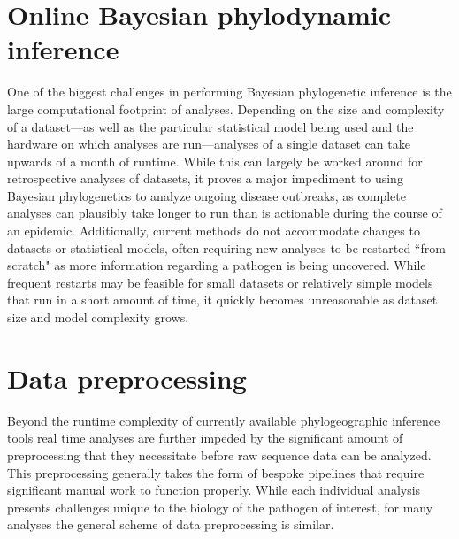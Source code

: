 \section{Online Bayesian phylodynamic inference} %

One of the biggest challenges in performing Bayesian phylogenetic inference is the large computational footprint of analyses.
Depending on the size and complexity of a dataset---as well as the particular statistical model being used and the hardware on which analyses are run---analyses of a single dataset can take upwards of a month of runtime.
While this can largely be worked around for retrospective analyses of datasets, it proves a major impediment to using Bayesian phylogenetics to analyze ongoing disease outbreaks, %
as complete analyses can plausibly take longer to run than is actionable during the course of an epidemic.
Additionally, current methods do not accommodate changes to datasets or statistical models, often requiring new analyses to be restarted ``from scratch" as more information regarding a pathogen is being uncovered.
While frequent restarts may be feasible for small datasets or relatively simple models that run in a short amount of time, it quickly becomes unreasonable as dataset size and model complexity grows.

\section{Data preprocessing} %

Beyond the runtime complexity of currently available phylogeographic inference tools real time analyses are further impeded by the significant amount of preprocessing that they necessitate before raw sequence data can be analyzed.
This preprocessing generally takes the form of bespoke pipelines that require significant manual work to function properly.
While each individual analysis presents challenges unique to the biology of the pathogen of interest, for many analyses the general scheme of data preprocessing is similar.

